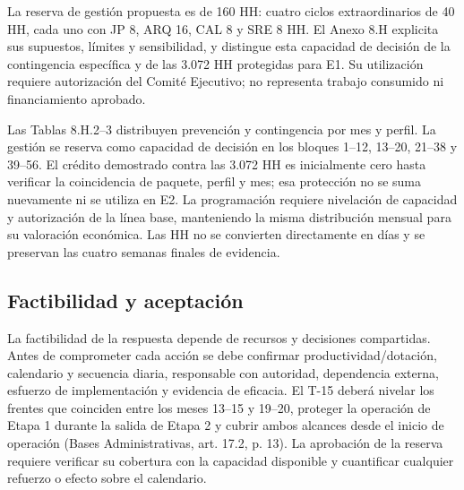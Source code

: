 La reserva de gestión propuesta es de 160 HH: cuatro ciclos extraordinarios de 40 HH, cada uno con JP 8, ARQ 16, CAL 8 y SRE 8 HH. El Anexo 8.H explicita sus supuestos, límites y sensibilidad, y distingue esta capacidad de decisión de la contingencia específica y de las 3.072 HH protegidas para E1. Su utilización requiere autorización del Comité Ejecutivo; no representa trabajo consumido ni financiamiento aprobado.

Las Tablas 8.H.2--3 distribuyen prevención y contingencia por mes y perfil. La gestión se reserva como capacidad de decisión en los bloques 1--12, 13--20, 21--38 y 39--56. El crédito demostrado contra las 3.072 HH es inicialmente cero hasta verificar la coincidencia de paquete, perfil y mes; esa protección no se suma nuevamente ni se utiliza en E2. La programación requiere nivelación de capacidad y autorización de la línea base, manteniendo la misma distribución mensual para su valoración económica. Las HH no se convierten directamente en días y se preservan las cuatro semanas finales de evidencia.

\subsection{Factibilidad y aceptación}

La factibilidad de la respuesta depende de recursos y decisiones compartidas. Antes de comprometer cada acción se debe confirmar productividad/dotación, calendario y secuencia diaria, responsable con autoridad, dependencia externa, esfuerzo de implementación y evidencia de eficacia. El T-15 deberá nivelar los frentes que coinciden entre los meses 13--15 y 19--20, proteger la operación de Etapa 1 durante la salida de Etapa 2 y cubrir ambos alcances desde el inicio de operación (Bases Administrativas, art. 17.2, p. 13). La aprobación de la reserva requiere verificar su cobertura con la capacidad disponible y cuantificar cualquier refuerzo o efecto sobre el calendario.

